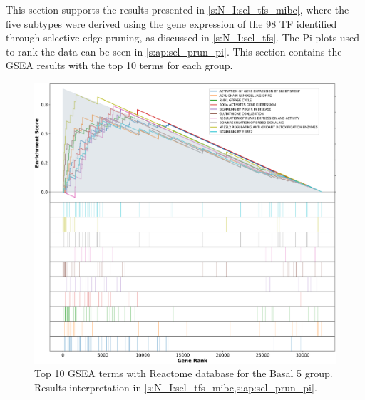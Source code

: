 This section supports the results presented in \cref{s:N_I:sel_tfs_mibc}, where the five subtypes were derived using the gene expression of the 98 TF identified through selective edge pruning, as discussed in \cref{s:N_I:sel_tfs}. The Pi plots used to rank the data can be seen in \cref{s:ap:sel_prun_pi}. This section contains the GSEA results with the top 10 terms for each group.


\begin{figure}[!htb]
    \centering
    \includegraphics[width=\textwidth,keepaspectratio]{Sections/Network_I/Resources/selective_pruning/gsea/smallBasal_10_top_manTerms.png}
    \caption[Basal 5: GSEA top 10 Reactome terms]{Top 10 GSEA terms with Reactome database for the Basal 5 group. Results interpretation in \cref{s:N_I:sel_tfs_mibc,s:ap:sel_prun_pi}.}
    \label{fig:ap:gsea_smallBasal}
\end{figure}


